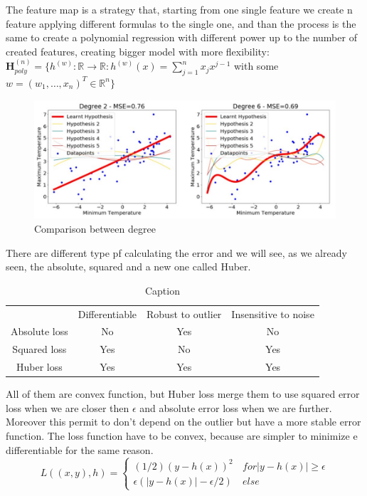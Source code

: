 The feature map is a strategy that, starting from one single feature we create n feature applying different formulas to the single one, and than the process is the same to create a polynomial regression with different power up to the number of created features, creating bigger model with more flexibility:\\
$\mathbf{H}^{(n)}_{poly} = \{ h^{(w)}: \mathbb{R} \rightarrow \mathbb{R} : h^{(w)} (x) = \sum\limits_{j=1}^n x_j x^{j-1}$ with some $w = (w_1, \dots, x_n)^T \in \mathbb{R}^n  \} $
\begin{figure}[H]
    \centering
    \includegraphics[scale=0.4]{images/ERM/ERM4.png}
    \caption{Comparison between degree}
    \label{fig:enter-label}
\end{figure}

There are different type pf calculating the error and we will see, as we already seen, the absolute, squared and a new one called Huber.

\begin{table}
    \centering
    \begin{tabular}{cccc}
         & Differentiable & Robust to outlier & Insensitive to noise \\
        Absolute loss & No & Yes & No\\
        Squared loss & Yes & No & Yes\\
        Huber loss & Yes & Yes & Yes\\
    \end{tabular}
    \caption{Caption}
    \label{tab:my_label}
\end{table}

All of them are convex function, but Huber loss merge them to use squared error loss when we are closer then $\epsilon$ and absolute error loss when we are further. Moreover this permit to don't depend on the outlier but have a more stable error function. The loss function have to be convex, because are simpler to minimize e differentiable for the same reason.
\begin{equation}
   L((x,y), h) =
    \begin{cases}
     (1/2)(y-h(x))^2 & for |y-h(x)| \ge \epsilon \\
     \epsilon (| y-h(x)| - \epsilon/2)\ & else
    \end{cases}       
\end{equation}

